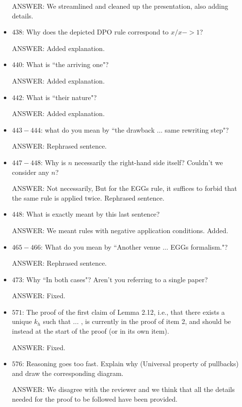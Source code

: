 \documentclass[english,11pt,a4paper]{article}
\begin{document}
\begin{itemize}
ANSWER: We streamlined and cleaned up the presentation, also adding details.

\item $438$: Why does the depicted DPO rule correspond to $x/x -> 1$?

ANSWER: Added explanation.

\item $440$: What is ``the arriving one"?

ANSWER: Added explanation.

\item $442$: What is ``their nature"?

ANSWER: Added explanation.

\item $443-444$: what do you mean by ``the drawback ... same rewriting step"?

ANSWER: Rephrased sentence.

\item $447-448$: Why is $n$ necessarily the right-hand side itself? Couldn't we consider any $n$?

ANSWER: Not necessarily, But for the EGGs rule, it suffices to forbid that the same rule is applied twice. Rephrased sentence.

\item $448$: What is exactly meant by this last sentence?

ANSWER: We meant rules with negative application conditions. Added.

\item $465-466$: What do you mean by ``Another venue ... EGGs formalism."?

ANSWER: Rephrased sentence.

\item $473$: Why ``In both cases"? Aren't you referring to a single paper? 

ANSWER: Fixed.

\item $571$: The proof of the first claim of Lemma 2.12, i.e., that there exists a unique $k_h$ such that ... , is currently in the proof of item 2, and should be instead at the start of the proof (or in its own item).

ANSWER: Fixed.

\item $576$: Reasoning goes too fast. Explain why (Universal property of pullbacks) and draw the corresponding diagram.

ANSWER: We disagree with the reviewer and we think that all the details needed for the proof to be followed have been provided. 


\end{itemize}
\end{document}

